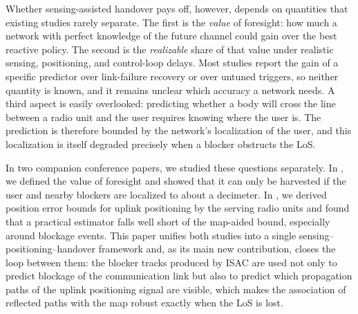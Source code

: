 \documentclass[journal]{IEEEtran}
\begin{document}
Whether sensing-assisted handover pays off, however, depends on
quantities that existing studies rarely separate. The first is the
\emph{value} of foresight: how much a network with perfect knowledge of
the future channel could gain over the best reactive policy. The second
is the \emph{realizable} share of that value under realistic sensing,
positioning, and control-loop delays. Most studies report the gain of a
specific predictor over link-failure recovery or over untuned triggers,
so neither quantity is known, and it remains unclear which accuracy a
network needs. A third aspect is easily overlooked: predicting whether a
body will cross the line between a radio unit and the user requires
knowing where the user is. The prediction is therefore bounded by the
network's localization of the user, and this localization is itself
degraded precisely when a blocker obstructs the LoS.

In two companion conference papers, we studied these questions
separately. In \cite{natanzi2027wcncA}, we defined the value of foresight
and showed that it can only be harvested if the user and nearby blockers
are localized to about a decimeter. In \cite{natanzi2027wcncB}, we
derived position error bounds for uplink positioning by the serving
radio units and found that a practical estimator falls well short of the
map-aided bound, especially around blockage events. This paper unifies
both studies into a single sensing--positioning--handover framework and,
\textcolor{propcol}{as its main new contribution, closes the loop between
them: the blocker tracks produced by ISAC are used not only to predict
blockage of the communication link but also to predict which propagation
paths of the uplink positioning signal are visible, which makes the
association of reflected paths with the map robust exactly when the LoS
is lost.}
\end{document}

